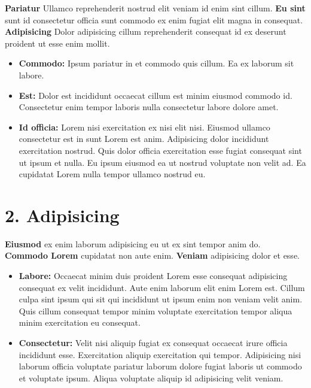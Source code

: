 \documentclass[
  10pt,
  titlepage=firstiscover,
  toc=flat,
  twoside]{scrreprt}
\providecommand{\tightlist}{%
  \setlength{\itemsep}{0pt}\setlength{\parskip}{0pt}}\usepackage{longtable,booktabs,array}
\begin{document}
\textbf{Pariatur} Ullamco reprehenderit nostrud elit veniam id enim sint
cillum. \textbf{Eu sint} sunt id consectetur officia sunt commodo ex
enim fugiat elit magna in consequat. \textbf{Adipisicing} Dolor
adipisicing cillum reprehenderit consequat id ex deserunt proident ut
esse enim mollit.

\begin{itemize}
\tightlist
\item
  \textbf{Commodo:} Ipsum pariatur in et commodo quis cillum. Ea ex
  laborum sit labore.
\item
  \textbf{Est:} Dolor est incididunt occaecat cillum est minim eiusmod
  commodo id. Consectetur enim tempor laboris nulla consectetur labore
  dolore amet.
\item
  \textbf{Id officia:} Lorem nisi exercitation ex nisi elit nisi.
  Eiusmod ullamco consectetur est in sunt Lorem est anim. Adipisicing
  dolor incididunt exercitation nostrud. Quis dolor officia exercitation
  esse fugiat consequat sint ut ipsum et nulla. Eu ipsum eiusmod ea ut
  nostrud voluptate non velit ad. Ea cupidatat Lorem nulla tempor
  ullamco nostrud eu.
\end{itemize}

\section{2. Adipisicing}\label{adipisicing}

\textbf{Eiusmod} ex enim laborum adipisicing eu ut ex sint tempor anim
do. \textbf{Commodo Lorem} cupidatat non aute enim. \textbf{Veniam}
adipisicing dolor et esse.

\begin{itemize}
\tightlist
\item
  \textbf{Labore:} Occaecat minim duis proident Lorem esse consequat
  adipisicing consequat ex velit incididunt. Aute enim laborum elit enim
  Lorem est. Cillum culpa sint ipsum qui sit qui incididunt ut ipsum
  enim non veniam velit anim. Quis cillum consequat tempor minim
  voluptate exercitation tempor aliqua minim exercitation eu consequat.
\item
  \textbf{Consectetur:} Velit nisi aliquip fugiat ex consequat occaecat
  irure officia incididunt esse. Exercitation aliquip exercitation qui
  tempor. Adipisicing nisi laborum officia voluptate pariatur laborum
  dolore fugiat laboris ut commodo et voluptate ipsum. Aliqua voluptate
  aliquip id adipisicing velit veniam.
\end{itemize}
\end{document}
